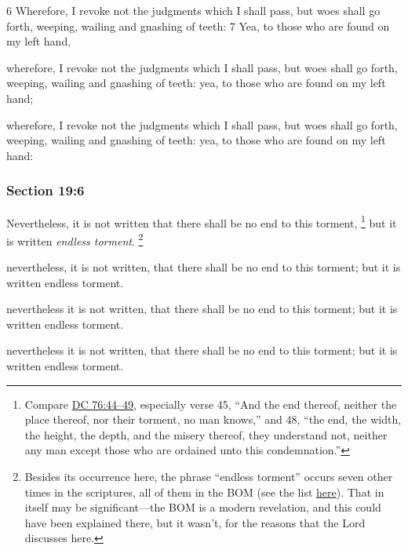 		\begin{framed}
		\scriptsize
			\begin{compactdesc}
				\item[JSP] 6 Wherefore, I revoke not the judgments which I shall pass, but woes shall go forth, weeping, wailing and gnashing of teeth: 7 Yea, to those who are found on my left hand,
				\item[RB1] [\textit{missing}]
				\item[DC 1835] wherefore, I revoke not the judgments which I shall pass, but woes shall go forth, weeping, wailing and gnashing of teeth: yea, to those who are found on my left hand; 
				\item[DC 1844] wherefore, I revoke not the judgments which I shall pass, but woes shall go forth, weeping, wailing and gnashing of teeth: yea, to those who are found on my left hand: 
			\end{compactdesc}
		\end{framed}

	\subsubsection{Section 19:6} %
		\label{DC19-6}

		Nevertheless, it is not written that there shall be no end to this torment,%
			\footnote{%
				Compare \hyperref[DC76-44]{DC 76:44--49}, especially verse 45, ``And the end thereof, neither the place thereof, nor their torment, no man knows,'' and 48, ``the end, the width, the height, the depth, and the misery thereof, they understand not, neither any man except those who are ordained unto this condemnation.'' 
				}
		but it is written \textit{endless torment}.%
			\footnote{%
				Besides its occurrence here, the phrase ``endless torment'' occurs seven other times in the scriptures, all of them in the BOM (see the list \hyperref[END-PHRASES]{here}). That in itself may be significant---the BOM is a modern revelation, and this could have been explained there, but it wasn't, for the reasons that the Lord discusses here.
				}

		\begin{framed}
		\scriptsize
			\begin{compactdesc}
				\item[JSP] nevertheless, it is not written, that there shall be no end to this torment; but it is written endless torment.
				\item[RB1] [\textit{missing}]
				\item[DC 1835] nevertheless it is not written, that there shall be no end to this torment; but it is written endless torment.
				\item[DC 1844] nevertheless it is not written, that there shall be no end to this torment; but it is written endless torment.
			\end{compactdesc}
		\end{framed}

